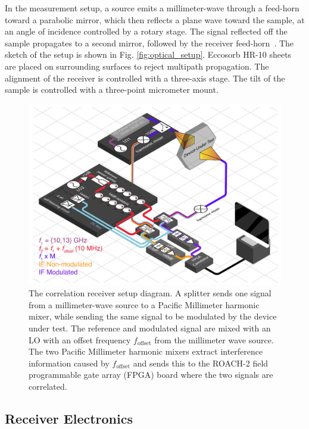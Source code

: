 In the measurement setup, a source emits a millimeter-wave through a feed-horn toward a parabolic mirror, which then reflects a plane wave toward the sample, at an angle of incidence controlled by a rotary stage. The signal reflected off the sample propagates to a second mirror, followed by the receiver feed-horn~\cite{ches18}. The sketch of the setup is shown in Fig. \ref{fig:optical_setup}. Eccosorb HR-10 sheets are placed on surrounding surfaces to reject multipath propagation. The alignment of the receiver is controlled with a three-axis stage. The tilt of the sample is controlled with a three-point micrometer mount.

\begin{figure}[t]
    \centering
    \includegraphics[width = \textwidth]{Figures/refl_isometric.pdf}
    \caption{The correlation receiver setup diagram. A splitter sends one signal from a millimeter-wave source to a Pacific Millimeter harmonic mixer, while sending the same signal to be modulated by the device under test. The reference and modulated signal are mixed with an LO with an offset frequency $f_{\textrm{offset}}$ from the millimeter wave source. The two Pacific Millimeter harmonic mixers extract interference information caused by $f_{\textrm{offset}}$ and sends this to the ROACH-2 field programmable gate array (FPGA) board where the two signals are correlated.}
    \label{fig:holog_ref_setup}
\end{figure}

\subsection{Receiver Electronics}

